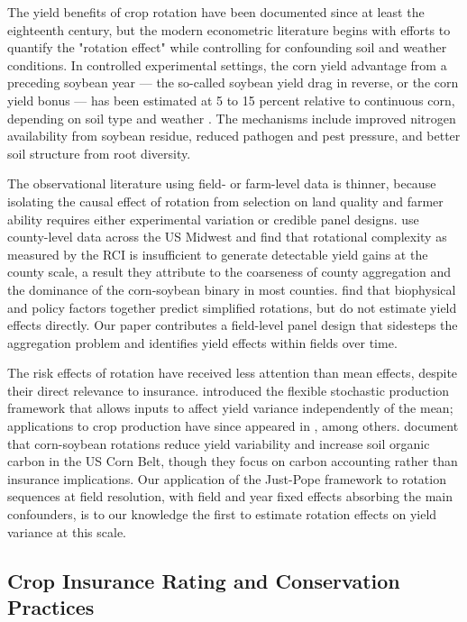 \documentclass[11pt,letterpaper]{article}
\theoremstyle{remark}
\theoremstyle{plain}
\theoremstyle{definition}
\begin{document}
The yield benefits of crop rotation have been documented since at least the eighteenth century, but the modern econometric literature begins with efforts to quantify the "rotation effect" while controlling for confounding soil and weather conditions. In controlled experimental settings, the corn yield advantage from a preceding soybean year — the so-called soybean yield drag in reverse, or the corn yield bonus — has been estimated at 5 to 15 percent relative to continuous corn, depending on soil type and weather \citep{Farmaha2016, Gentry2015}. The mechanisms include improved nitrogen availability from soybean residue, reduced pathogen and pest pressure, and better soil structure from root diversity.

The observational literature using field- or farm-level data is thinner, because isolating the causal effect of rotation from selection on land quality and farmer ability requires either experimental variation or credible panel designs. \cite{burchfield2024} use county-level data across the US Midwest and find that rotational complexity as measured by the RCI is insufficient to generate detectable yield gains at the county scale, a result they attribute to the coarseness of county aggregation and the dominance of the corn-soybean binary in most counties. \cite{socolar2021} find that biophysical and policy factors together predict simplified rotations, but do not estimate yield effects directly. Our paper contributes a field-level panel design that sidesteps the aggregation problem and identifies yield effects within fields over time.

The risk effects of rotation have received less attention than mean effects, despite their direct relevance to insurance. \cite{Just1979} introduced the flexible stochastic production framework that allows inputs to affect yield variance independently of the mean; applications to crop production have since appeared in \cite{antle1983, shi2013, li2021}, among others. \cite{wu2025} document that corn-soybean rotations reduce yield variability and increase soil organic carbon in the US Corn Belt, though they focus on carbon accounting rather than insurance implications. Our application of the Just-Pope framework to rotation sequences at field resolution, with field and year fixed effects absorbing the main confounders, is to our knowledge the first to estimate rotation effects on yield variance at this scale.

\subsection{\label{subsec:insurance_rating} Crop Insurance Rating and Conservation Practices}
\end{document}
